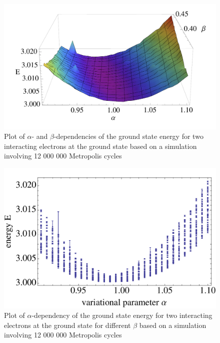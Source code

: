 \begin{figure}[htbp]
    \centering
    \includegraphics[scale=0.45]{2electron}
    \caption{Plot of $\alpha$- and $\beta$-dependencies of the ground state energy for two interacting electrons at the ground state based on a simulation involving 12 000 000 Metropolis cycles}
    \label{fig:2electron}
\end{figure}
\begin{figure}[htbp]
    \centering
    \includegraphics[scale=0.45]{2electronalpha}
    \caption{Plot of $\alpha$-dependency of the ground state energy for two interacting electrons at the ground state for different $\beta$ based on a simulation involving 12 000 000 Metropolis cycles}
    \label{fig:2electronalpha}
\end{figure}
